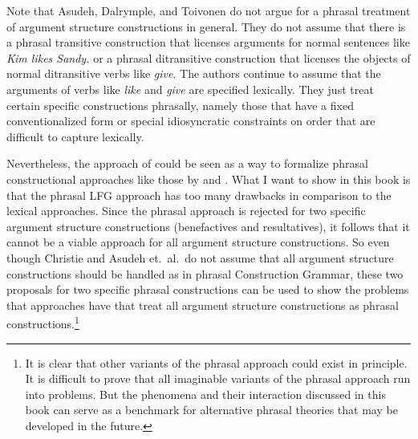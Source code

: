   Note that Asudeh, Dalrymple, and Toivonen do not argue for a phrasal treatment of argument
  structure constructions in general. They do not assume that there is a phrasal transitive
  construction that licenses arguments for normal sentences like \emph{Kim likes Sandy.} or a
  phrasal ditransitive construction that licenses the objects of normal ditransitive verbs like
  \emph{give}. The authors continue to assume that the arguments of verbs like \emph{like} and
  \emph{give} are specified lexically. They
  just treat certain specific constructions phrasally, namely those that have a fixed
  conventionalized form or special idiosyncratic constraints on order that are difficult to capture lexically.


  Nevertheless, the approach of \citet{AGT2014a} could be seen as a way to formalize phrasal constructional
  approaches like those by \citet{Goldberg95a,Goldberg2004a} and \citet{CJ2005a}. What I want to
  show in this book is that the phrasal LFG approach has
  too many drawbacks in comparison to the lexical approaches. Since the phrasal approach is rejected
  for two specific argument structure constructions (benefactives and resultatives), it follows that it cannot be a viable approach
  for all argument structure constructions. So even though Christie and Asudeh et.\ al.\ do not
  assume that all argument structure constructions should be handled as in phrasal Construction
  Grammar, these two proposals for two specific phrasal constructions can be used to show the problems that approaches have that
  treat all argument structure constructions as phrasal constructions.\footnote{%
    It is clear that other variants of the phrasal approach could exist in principle. It is
    difficult to prove that all imaginable variants of the phrasal approach run into problems. But
    the phenomena and their interaction discussed in this book can serve as a benchmark for
    alternative phrasal theories that may be developed in the future.
}

